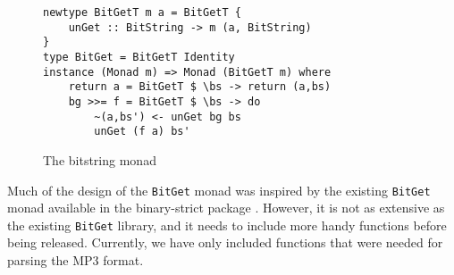 \documentclass[a4paper,12pt]{article}
\begin{document}
\begin{figure}[H]
  \begin{center}
        \begin{lstlisting}
newtype BitGetT m a = BitGetT {
    unGet :: BitString -> m (a, BitString)
}
type BitGet = BitGetT Identity
instance (Monad m) => Monad (BitGetT m) where
    return a = BitGetT $ \bs -> return (a,bs)
    bg >>= f = BitGetT $ \bs -> do
        ~(a,bs') <- unGet bg bs
        unGet (f a) bs'
    \end{lstlisting}
    \caption{The bitstring monad}\label{fig:bitstringmonad}
  \end{center}
\end{figure}

    Much of the design of the \texttt{BitGet} monad was inspired by the existing
    \texttt{BitGet} monad available in the binary-strict package
    \cite{binarystrict}. However, it is not as extensive as the existing
    \texttt{BitGet} library, and it needs to include more handy functions before
    being released. Currently, we have only included functions that were needed
    for parsing the MP3 format.
\end{document}
